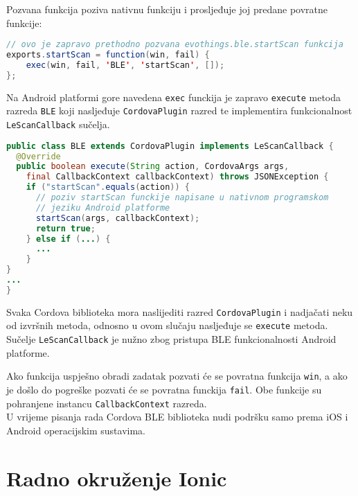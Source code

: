 Pozvana funkcija poziva nativnu funkciju i prosljeđuje joj predane povratne funkcije:
\begin{lstlisting}[language=java, morekeywords={var,function}]
// ovo je zapravo prethodno pozvana evothings.ble.startScan funkcija
exports.startScan = function(win, fail) {
	exec(win, fail, 'BLE', 'startScan', []);
};
\end{lstlisting}

Na Android platformi gore navedena \texttt{exec} funckija je zapravo \texttt{execute} metoda razreda \texttt{BLE} koji nasljeđuje \texttt{CordovaPlugin} razred te implementira funkcionalnost \texttt{LeScanCallback} sučelja. 
\begin{lstlisting}[language=java]
public class BLE extends CordovaPlugin implements LeScanCallback {
  @Override
  public boolean execute(String action, CordovaArgs args, 
    final CallbackContext callbackContext) throws JSONException {
    if ("startScan".equals(action)) {
      // poziv startScan funckije napisane u nativnom programskom
      // jeziku Android platforme
      startScan(args, callbackContext); 
      return true;
    } else if (...) {
      ...
    }
}
...
}
\end{lstlisting}

Svaka Cordova biblioteka mora naslijediti razred \texttt{CordovaPlugin} i nadjačati neku od   izvršnih metoda, odnosno u ovom slučaju nasljeđuje se \texttt{execute} metoda. 
Sučelje \texttt{LeScanCallback} je nužno zbog pristupa BLE funkcionalnosti Android platforme.

Ako funkcija uspješno obradi zadatak pozvati će se povratna funkcija \texttt{win}, a ako je došlo do pogreške pozvati će se povratna funckija \texttt{fail}. 
Obe funkcije su pohranjene instancu \texttt{CallbackContext} razreda.
\\

U vrijeme pisanja rada Cordova BLE biblioteka nudi podršku samo prema iOS i Android operacijskim sustavima.

\section{Radno okruženje Ionic}

